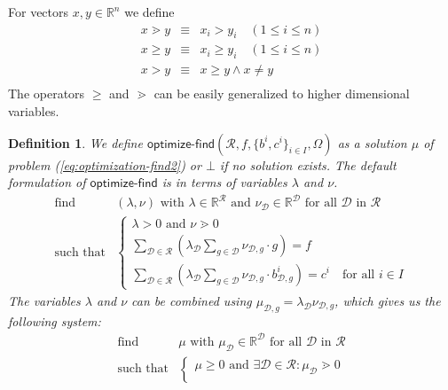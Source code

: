 \documentclass{article}
\theoremstyle{mytheorem}
\newtheorem{definition}[theorem]{Definition}
\newcommand{\func}[1]{\ensuremath{\textsf{#1}}} %
\newcommand{\set}[1]{\ensuremath{\{ #1 \} }} %
\begin{document}
\vspace{0.5cm}
\noindent
For vectors $x, y \in \mathbb{R}^n$ we define
\[
  \begin{array}{lll}
     x \gtrdot y & \equiv & x_i > y_i \quad (1 \leq i \leq n) \\
     x \geq y & \equiv & x_i \geq y_i \quad (1 \leq i \leq n) \\
     x > y & \equiv & x \geq y \land x \neq y \\
  \end{array}
\]
The operators $\geq$ and $\gtrdot$ can be easily generalized to higher dimensional variables.

\begin{definition}
We define $\func{optimize-find}(\mathcal{R}, f, \set{b^i, c^i}_{i \in I}, \Omega)$ as a solution $\mu$ of problem (\ref{eq:optimization-find2}) or $\bot$ if no solution exists.
The default formulation of \func{optimize-find} is in terms of variables $\lambda$ and $\nu$.
\begin{equation} \label{eq:optimization-find1}
\begin{array}{ll}
    \text{find} & (\lambda, \nu)
    \text{ with } \lambda \in \mathbb{R}^\mathcal{R} \text{ and } 
    \nu_\mathcal{D} \in \mathbb{R}^\mathcal{D}
    \text{ for all } \mathcal{D} \text{ in } \mathcal{R} 
    \\ [0.5cm]
    \text{such that} & 
    \left\{
    \begin{array}{ll}
         \lambda > 0 \text{ and } \nu \gtrdot 0
         \\ [0.2cm]
    
         \sum\limits_{\mathcal{D} \in \mathcal{R}}
         (
         \lambda_\mathcal{D} \sum\limits_{g \in \mathcal{D}} 
           \nu_{\mathcal{D},g} \cdot g 
         )
         = f
         \\ [0.5cm]         

         \sum\limits_{\mathcal{D} \in \mathcal{R}}
         (
         \lambda_\mathcal{D} \sum\limits_{g \in \mathcal{D}} 
           \nu_{\mathcal{D},g} \cdot b^i_{\mathcal{D},g}
         )
         = c^i
         \quad \text{for all } i \in I
    \end{array}
    \right.
\end{array}
\end{equation}
The variables $\lambda$ and $\nu$ can be combined using $\mu_{\mathcal{D},g} = \lambda_\mathcal{D} \nu_{\mathcal{D},g}$, which gives us the following system:
\begin{equation} \label{eq:optimization-find2}
\begin{array}{ll}
    \text{find} & \mu
    \text{ with } \mu_\mathcal{D} \in \mathbb{R}^\mathcal{D}
    \text{ for all } \mathcal{D} \text{ in } \mathcal{R} 
    \\ [0.5cm]
    \text{such that} & 
    \left\{
    \begin{array}{ll}
         \mu \geq 0 \text{ and }
         \exists \mathcal{D} \in \mathcal{R}: \mu_\mathcal{D} \gtrdot 0
         \\ [0.2cm]
    

\end{array}
\end{array}
\end{equation}
\end{definition}
\end{document}
